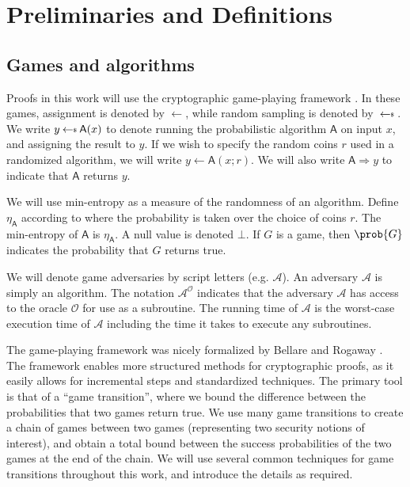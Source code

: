 \chapter{Preliminaries and Definitions} \label{sec:preliminaries}

\section{Games and algorithms}
Proofs in this work will use the cryptographic game-playing framework \cite{EC:BelRog06}. In these games, assignment is denoted by $\leftarrow$, while random sampling is denoted by $\sample$. We write $y \sample \mathsf{A}(x)$ to denote running the probabilistic algorithm $\mathsf{A}$ on input $x$, and assigning the result to $y$. If we wish to specify the random coins $r$ used in a randomized algorithm, we will write $y \leftarrow \mathsf{A}(x;r)$. We will also write $\mathsf{A} \Rightarrow y$ to indicate that $\mathsf{A}$ returns $y$.

We will use min-entropy as a measure of the randomness of an algorithm. Define $\eta_\mathsf{A}$ according to
where the probability is taken over the choice of coins $r$. The min-entropy of $\mathsf{A}$ is $\eta_\mathsf{A}$. A null value is denoted $\bot$. If $G$ is a game, then $\prob{G}$ indicates the probability that $G$ returns true. 

We will denote game adversaries by script letters (e.g. $\mathcal{A}$). An adversary $\mathcal{A}$ is simply an algorithm. The notation $\mathcal{A}^{\mathcal{O}}$ indicates that the adversary $\mathcal{A}$ has access to the oracle $\mathcal{O}$ for use as a subroutine. The running time of $\mathcal{A}$ is the worst-case execution time of $\mathcal{A}$ including the time it takes to execute any subroutines.

The game-playing framework was nicely formalized by Bellare and Rogaway \cite{EC:BelRog06}. The framework enables more structured methods for cryptographic proofs, as it easily allows for incremental steps and standardized techniques. The primary tool is that of a ``game transition'', where we bound the difference between the probabilities that two games return true. We use many game transitions to create a chain of games between two games (representing two security notions of interest), and obtain a total bound between the success probabilities of the two games at the end of the chain. We will use several common techniques for game transitions throughout this work, and introduce the details as required.


